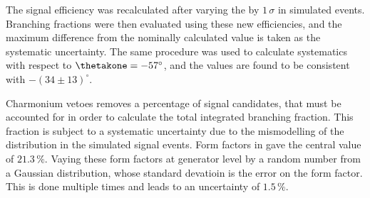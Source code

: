 The signal efficiency was recalculated after varying the \thetakone by $1\,\sigma$ in simulated
 events.
Branching fractions were then evaluated using these new efficiencies, and the maximum difference
from the nominally calculated value is taken as the systematic uncertainty.
The same procedure was used to calculate systematics with respect to $\thetakone=-57^\circ$, and
the values are found to be consistent with $-(34\pm13)^\circ$.

Charmonium vetoes removes a percentage of signal candidates, that must be accounted for in order to
calculate the total integrated branching fraction.
This fraction is subject to a systematic uncertainty due to the mismodelling of the \qsq
distribution in the simulated signal events.
Form factors in  gave the central value of $21.3\,\%$.
Vaying these form factors at generator level by a random number from a Gaussian distribution, whose
standard devatioin is the error on the form factor.
This is done multiple times and leads to an uncertainty of $1.5\,\%$.























